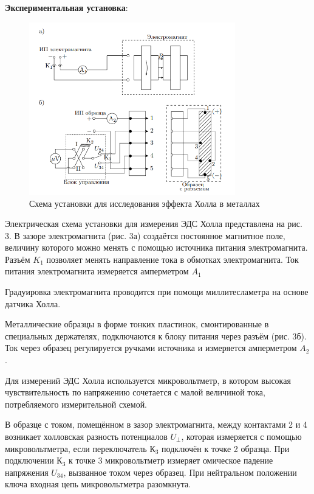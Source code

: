 \documentclass[a4paper,12pt]{article}
\begin{document}
\textbf{Экспериментальная установка}:
\begin{figure}[H]\label{fig: ustanovka}
    \centering
    \includegraphics[width = 0.8\textwidth]{Установка.png}
    \caption{Схема установки для исследования эффекта Холла в металлах}
\end{figure}
Электрическая схема установки для измерения ЭДС Холла представлена на рис. 3. В зазоре электромагнита (рис. 3а) создаётся постоянное магнитное поле, величину которого можно менять с помощью источника питания электромагнита. Разъём $K_1$ позволяет менять направление тока в обмотках электромагнита. Ток питания электромагнита измеряется амперметром $A_1$

Градуировка электромагнита проводится при помощи  миллитесламетра на основе датчика Холла.

Металлические образцы в форме тонких пластинок, смонтированные в специальных держателях, подключаются к блоку питания через разъём (рис. 3б). Ток через образец регулируется ручками источника и измеряется амперметром $A_2$.

Для измерений ЭДС Холла используется микровольтметр, в котором
высокая чувствительность по напряжению сочетается с малой величиной тока, потребляемого измерительной схемой.

В образце с током, помещённом в зазор электромагнита, между контактами 2 и 4 возникает холловская разность потенциалов $U_{\perp}$, которая
измеряется с помощью микровольтметра, если переключатель $К_3$ подключён к точке 2 образца. При подключении $К_3$ к точке 3 микровольтметр измеряет омическое падение напряжения $U_{34}$, вызванное током через образец. При нейтральном положении ключа входная цепь микровольтметра разомкнута.
\end{document}
